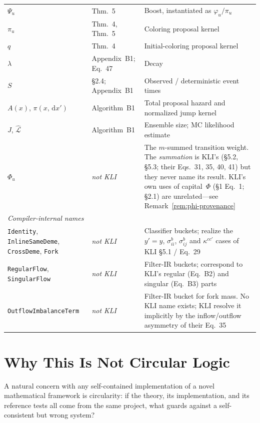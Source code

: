 \documentclass[11pt,leqno]{article}
\newcommand{\dd}[1]{\,\mathrm{d}{#1}}
\newcommand{\lik}{\mathcal{L}}      %
\newcommand{\code}[1]{\texttt{#1}}
\theoremstyle{plain}
\theoremstyle{definition}
\begin{document}
\begin{longtable}{@{}p{}p{}p{}@{}}
$\Psi_u$ & Thm.~5 & Boost, instantiated as $\varphi_u/\pi_u$ \\
$\pi_u$ & Thm.~4, Thm.~5 & Coloring proposal kernel \\
$q$ & Thm.~4 & Initial-coloring proposal kernel \\
$\lambda$ & Appendix~B1; Eq.~47 & Decay \\
$S$ & \S2.4; Appendix~B1 & Observed / deterministic event times \\
$A(x)$, $\pi(x,\dd{x'})$ & Algorithm~B1 & Total proposal hazard and
  normalized jump kernel \\
$J$, $\hat{\lik}$ & Algorithm~B1 & Ensemble size; MC likelihood estimate \\
$\Phi_u$ & \emph{not KLI} & The $m$-summed transition weight.  The
  \emph{summation} is KLI's (\S5.2, \S5.3; their Eqs.~31, 35, 40, 41)
  but they never name its result.  KLI's own uses of capital~$\Phi$
  (\S1 Eq.~1; \S2.1) are unrelated---see
  Remark~\ref{rem:phi-provenance} \\
\midrule
\multicolumn{3}{l}{\textit{Compiler-internal names}}\\
\code{Identity}, \code{InlineSameDeme},
  \code{CrossDeme}, \code{Fork}
  & \emph{not KLI} & Classifier buckets; realize the $y'=y$,
  $\sigma^b_{ii}$, $\sigma^b_{ij}$ and $\kappa^{cc'}$ cases of
  KLI \S5.1 / Eq.~29 \\
\code{RegularFlow}, \code{SingularFlow}
  & \emph{not KLI} & Filter-IR buckets; correspond to KLI's regular
  (Eq.~B2) and singular (Eq.~B3) parts \\
\code{OutflowImbalanceTerm}
  & \emph{not KLI} & Filter-IR bucket for fork mass.  No KLI name
  exists; KLI resolve it implicitly by the inflow/outflow asymmetry of
  their Eq.~35 \\
\end{longtable}


\section{Why This Is Not Circular Logic}
\label{sec:non-circularity}

A natural concern with any self-contained implementation of a novel
mathematical framework is circularity: if the theory, its
implementation, and its reference tests all come from the same project,
what guards against a self-consistent but wrong system?
\end{document}
